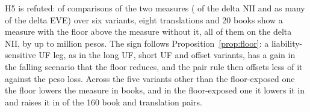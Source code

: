 H5 is refuted: \floorsRaise{} of \floorsTotal{} comparisons of the two measures (\floorsTotalNii{} of the delta NII and as many of the delta EVE) over six variants, eight translations and 20 books show a measure with the floor above the measure without it, all of them on the delta NII, by up to \floorsMaxInc{} million pesos. The sign follows Proposition~\ref{prop:floor}: a liability-sensitive UF leg, as in the long UF, short UF and offset variants, has a gain in the falling scenario that the floor reduces, and the pair rule then offsets less of it against the peso loss. Across the five variants other than the floor-exposed one the floor lowers the measure in \floorsLowerOthers{} books, and in the floor-exposed one it lowers it in \floorsLowerTotalFlr{} and raises it in \floorsRaiseTotalFlr{} of the 160 book and translation pairs.
